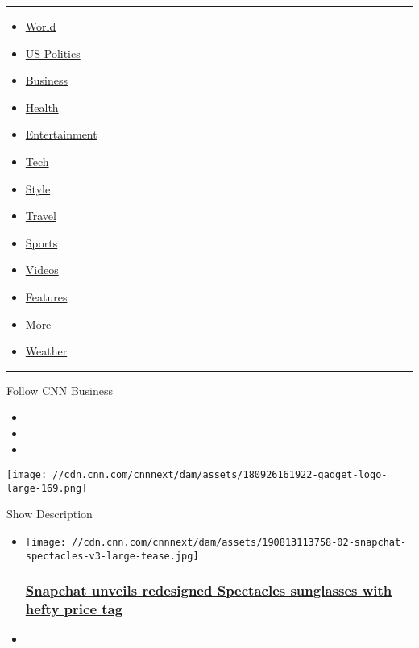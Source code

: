 \begin{center}\rule{0.5\linewidth}{\linethickness}\end{center}

\begin{itemize}
\tightlist
\item
  \href{/world}{World}
\item
  \href{/politics}{US Politics}
\item
  \href{/business}{Business}
\item
  \href{/health}{Health}
\item
  \href{/entertainment}{Entertainment}
\item
  \href{/business/tech}{Tech}
\item
  \href{/style}{Style}
\item
  \href{/travel}{Travel}
\item
  \href{/sport}{Sports}
\item
  \href{/videos}{Videos}
\item
  \href{/specials}{Features}
\item
  \href{/more}{More}
\item
  \href{/weather}{Weather}
\end{itemize}

\begin{center}\rule{0.5\linewidth}{\linethickness}\end{center}

Follow CNN Business

\begin{itemize}
\item
\item
\item
\end{itemize}

\texttt{[image: //cdn.cnn.com/cnnnext/dam/assets/180926161922-gadget-logo-large-169.png]}

Show Description

\begin{itemize}
\item
  \href{/2019/08/13/tech/snapchat-spectacles-3/index.html}{}

  \texttt{[image: //cdn.cnn.com/cnnnext/dam/assets/190813113758-02-snapchat-spectacles-v3-large-tease.jpg]}

  \hypertarget{snapchat-unveils-redesigned-spectacles-sunglasses-with-hefty-price-tag}{%
  \subsubsection{\texorpdfstring{\href{/2019/08/13/tech/snapchat-spectacles-3/index.html}{Snapchat
  unveils redesigned Spectacles sunglasses with hefty price
  tag}}{Snapchat unveils redesigned Spectacles sunglasses with hefty price tag}}\label{snapchat-unveils-redesigned-spectacles-sunglasses-with-hefty-price-tag}}
\item
\end{itemize}

